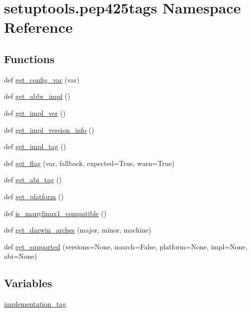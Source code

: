 \hypertarget{namespacesetuptools_1_1pep425tags}{}\section{setuptools.\+pep425tags Namespace Reference}
\label{namespacesetuptools_1_1pep425tags}
\subsection*{Functions}
\begin{DoxyCompactItemize}
\item 
def \hyperlink{namespacesetuptools_1_1pep425tags_aeee1031168dc6799ebdbd716b6add916}{get\+\_\+config\+\_\+var} (var)
\item 
def \hyperlink{namespacesetuptools_1_1pep425tags_ae7417234ead613c11d1a7e086ec7de33}{get\+\_\+abbr\+\_\+impl} ()
\item 
def \hyperlink{namespacesetuptools_1_1pep425tags_a7efac7a50a34cdf95aafe1525618f1a0}{get\+\_\+impl\+\_\+ver} ()
\item 
def \hyperlink{namespacesetuptools_1_1pep425tags_a48fbcb65fd13f86112a44931eba41558}{get\+\_\+impl\+\_\+version\+\_\+info} ()
\item 
def \hyperlink{namespacesetuptools_1_1pep425tags_a78e173e71dbe3c21ff6d6391f2758ee8}{get\+\_\+impl\+\_\+tag} ()
\item 
def \hyperlink{namespacesetuptools_1_1pep425tags_a3ab97ebe194f0b74821cf471dc8603d5}{get\+\_\+flag} (var, fallback, expected=True, warn=True)
\item 
def \hyperlink{namespacesetuptools_1_1pep425tags_a7b3a05cd39eac1054cb82d0f80097f42}{get\+\_\+abi\+\_\+tag} ()
\item 
def \hyperlink{namespacesetuptools_1_1pep425tags_a52d6789c69021dee973e4f9b342f65b1}{get\+\_\+platform} ()
\item 
def \hyperlink{namespacesetuptools_1_1pep425tags_adb43f3f86ca42f291e0b493973ff9613}{is\+\_\+manylinux1\+\_\+compatible} ()
\item 
def \hyperlink{namespacesetuptools_1_1pep425tags_a00fd71952d89cf14bdb56e5ba7289936}{get\+\_\+darwin\+\_\+arches} (major, minor, machine)
\item 
def \hyperlink{namespacesetuptools_1_1pep425tags_a0f5730fc6765b4a3156dc37d475d59bb}{get\+\_\+supported} (versions=None, noarch=False, platform=None, impl=None, abi=None)
\end{DoxyCompactItemize}
\subsection*{Variables}
\begin{DoxyCompactItemize}
\item 
\hyperlink{namespacesetuptools_1_1pep425tags_abbe9e83f958d9ddcd9ddd75982fd3d5e}{implementation\+\_\+tag}
\end{DoxyCompactItemize}


